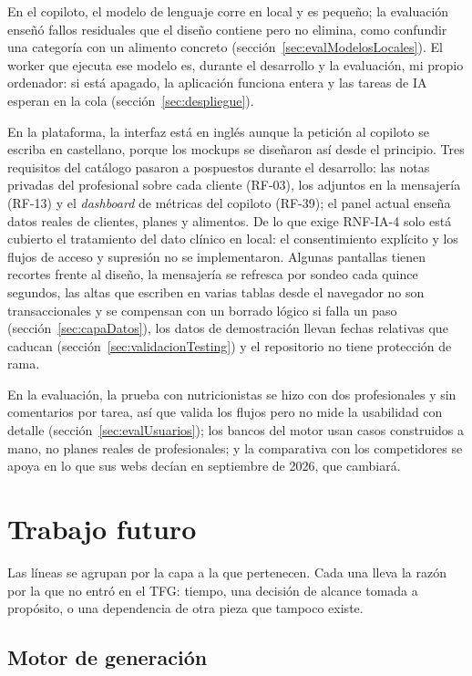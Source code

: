 En el copiloto, el modelo de lenguaje corre en local y es pequeño; la evaluación enseñó fallos residuales que el diseño contiene pero no elimina, como confundir una categoría con un alimento concreto (sección~\ref{sec:evalModelosLocales}). El worker que ejecuta ese modelo es, durante el desarrollo y la evaluación, mi propio ordenador: si está apagado, la aplicación funciona entera y las tareas de IA esperan en la cola (sección~\ref{sec:despliegue}).

En la plataforma, la interfaz está en inglés aunque la petición al copiloto se escriba en castellano, porque los mockups se diseñaron así desde el principio. Tres requisitos del catálogo pasaron a pospuestos durante el desarrollo: las notas privadas del profesional sobre cada cliente (RF-03), los adjuntos en la mensajería (RF-13) y el \textit{dashboard} de métricas del copiloto (RF-39); el panel actual enseña datos reales de clientes, planes y alimentos. De lo que exige RNF-IA-4 solo está cubierto el tratamiento del dato clínico en local: el consentimiento explícito y los flujos de acceso y supresión no se implementaron. Algunas pantallas tienen recortes frente al diseño, la mensajería se refresca por sondeo cada quince segundos, las altas que escriben en varias tablas desde el navegador no son transaccionales y se compensan con un borrado lógico si falla un paso (sección~\ref{sec:capaDatos}), los datos de demostración llevan fechas relativas que caducan (sección~\ref{sec:validacionTesting}) y el repositorio no tiene protección de rama.

En la evaluación, la prueba con nutricionistas se hizo con dos profesionales y sin comentarios por tarea, así que valida los flujos pero no mide la usabilidad con detalle (sección~\ref{sec:evalUsuarios}); los bancos del motor usan casos construidos a mano, no planes reales de profesionales; y la comparativa con los competidores se apoya en lo que sus webs decían en septiembre de 2026, que cambiará.

\section{Trabajo futuro}
\label{sec:trabajoFuturo}

Las líneas se agrupan por la capa a la que pertenecen. Cada una lleva la razón por la que no entró en el TFG: tiempo, una decisión de alcance tomada a propósito, o una dependencia de otra pieza que tampoco existe.

\subsection{Motor de generación}
\label{sec:futuroMotor}

